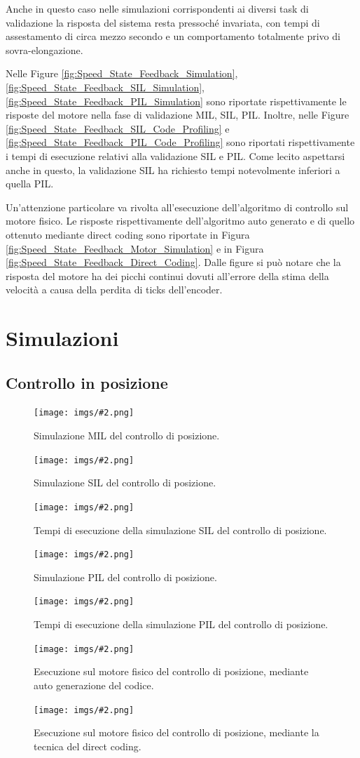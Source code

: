 \documentclass[11pt,a4paper,oneside]{extarticle}
\newcommand\img[3]{
    \begin{figure}[H]\centering
        \texttt{[image: imgs/\#2.png]}
        \caption{#3}
        \label{fig:#2}
    \end{figure}
}
\begin{document}
Anche in questo caso nelle simulazioni corrispondenti ai diversi task di validazione la risposta del sistema resta pressoché invariata, con tempi di assestamento di circa mezzo secondo e un comportamento totalmente privo di sovra-elongazione.\bigskip

Nelle Figure \ref{fig:Speed_State_Feedback_Simulation}, \ref{fig:Speed_State_Feedback_SIL_Simulation}, \ref{fig:Speed_State_Feedback_PIL_Simulation} sono riportate rispettivamente le risposte del motore nella fase di validazione MIL, SIL, PIL. Inoltre, nelle Figure \ref{fig:Speed_State_Feedback_SIL_Code_Profiling} e \ref{fig:Speed_State_Feedback_PIL_Code_Profiling} sono riportati rispettivamente i tempi di esecuzione relativi alla validazione SIL e PIL. Come lecito aspettarsi anche in questo, la validazione SIL ha richiesto tempi notevolmente inferiori a quella PIL.\bigskip

Un'attenzione particolare va rivolta all'esecuzione dell'algoritmo di controllo sul motore fisico. Le risposte rispettivamente dell'algoritmo auto generato e di quello ottenuto mediante direct coding sono riportate in Figura \ref{fig:Speed_State_Feedback_Motor_Simulation} e in Figura \ref{fig:Speed_State_Feedback_Direct_Coding}. Dalle figure si può notare che la risposta del motore ha dei picchi continui dovuti all'errore della stima della velocità a causa della perdita di ticks dell'encoder.


\newpage
\appendix
\section{Simulazioni}
\subsection{Controllo in posizione}

\img{1}{Position_State_Feedback_Simulation}{Simulazione MIL del controllo di posizione.}
\img{1}{Position_State_Feedback_SIL_Simulation}{Simulazione SIL del controllo di posizione.}
\img{1}{Position_State_Feedback_SIL_Code_Profiling}{Tempi di esecuzione della simulazione SIL del controllo di posizione.}
\img{1}{Position_State_Feedback_PIL_Simulation}{Simulazione PIL del controllo di posizione.}
\img{1}{Position_State_Feedback_PIL_Code_Profiling}{Tempi di esecuzione della simulazione PIL del controllo di posizione.}
\img{1}{Position_State_Feedback_Motor_Simulation}{Esecuzione sul motore fisico del controllo di posizione, mediante auto generazione del codice.}
\img{1}{Position_State_Feedback_Direct_Coding}{Esecuzione sul motore fisico del controllo di posizione, mediante la tecnica del direct coding.}
\end{document}
